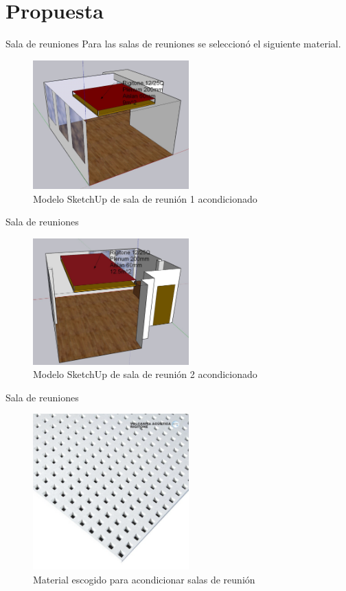 \documentclass{sintefbeamer}
\begin{document}
\section{Propuesta}
\begin{frame}{Sala de reuniones}
    Para las salas de reuniones se seleccionó el siguiente material.
    \begin{figure}
        \centering
        \includegraphics[width=6cm]{images/Propuesta/propuesta_reunion1.jpg}
        \caption{Modelo SketchUp de sala de reunión 1 acondicionado}
        \label{fig:modelo sketchup sala 1 acond}
    \end{figure}
\end{frame}
\begin{frame}{Sala de reuniones}
    \begin{figure}
        \centering
        \includegraphics[width=6cm]{images/Propuesta/propuesta_reunion2.jpg}
        \caption{Modelo SketchUp de sala de reunión 2 acondicionado}
        \label{fig:modelo sketchup sala 2 acond}
    \end{figure}
    
\end{frame}
\begin{frame}{Sala de reuniones}
    \begin{figure}[H]
        \centering
        \includegraphics[width=6cm]{images/Propuesta/Rigitone-12-25Q.png}
        \caption{Material escogido para acondicionar salas de reunión}
        \label{fig:material escogido para acond salas de reunion}
    \end{figure}
\end{frame}
\end{document}
